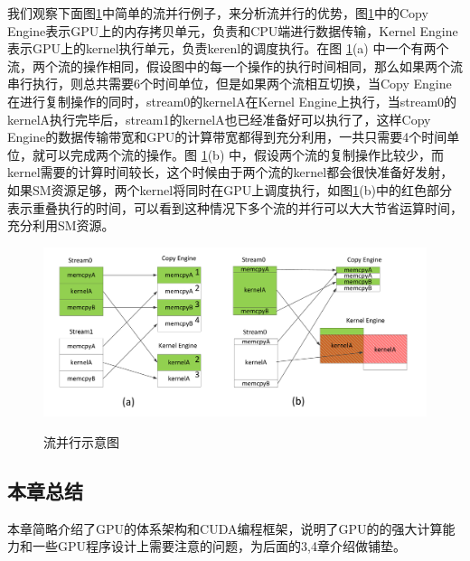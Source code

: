 我们观察下面图\ref{flow}中简单的流并行例子，来分析流并行的优势，图\ref{flow}中的Copy Engine表示GPU上的内存拷贝单元，负责和CPU端进行数据传输，Kernel Engine表示GPU上的kernel执行单元，负责kerenl的调度执行。在图 \ref{flow}(a) 中一个有两个流，两个流的操作相同，假设图中的每一个操作的执行时间相同，那么如果两个流串行执行，则总共需要6个时间单位，但是如果两个流相互切换，当Copy Engine在进行复制操作的同时，stream0的kernelA在Kernel Engine上执行，当stream0的kernelA执行完毕后，stream1的kernelA也已经准备好可以执行了，这样Copy Engine的数据传输带宽和GPU的计算带宽都得到充分利用，一共只需要4个时间单位，就可以完成两个流的操作。图 \ref{flow}(b) 中，假设两个流的复制操作比较少，而kernel需要的计算时间较长，这个时候由于两个流的kernel都会很快准备好发射，如果SM资源足够，两个kernel将同时在GPU上调度执行，如图\ref{flow}(b)中的红色部分表示重叠执行的时间，可以看到这种情况下多个流的并行可以大大节省运算时间，充分利用SM资源。
\begin{figure}
\setlength{\belowcaptionskip}{-0.5cm}
\begin{center}
{\includegraphics[width=1 \textwidth]{figures/flow.pdf}}
\end{center}
\caption{{\footnotesize{流并行示意图}}}
\label{flow}
\end{figure}
\subsection{本章总结}
本章简略介绍了GPU的体系架构和CUDA编程框架，说明了GPU的的强大计算能力和一些GPU程序设计上需要注意的问题，为后面的3,4章介绍做铺垫。
